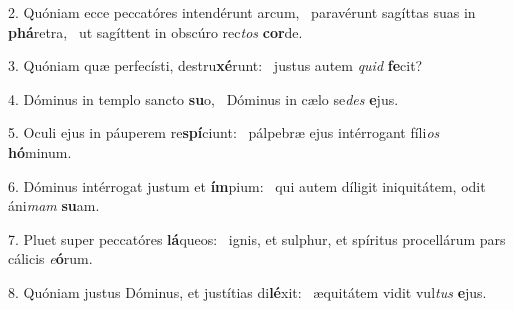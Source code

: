 2. Quóniam ecce peccatóres intendérunt arcum, \dag\  paravérunt sagíttas suas in \textbf{phá}retra, \ast\  ut sagíttent in obscúro rec\textit{tos} \textbf{cor}de.\

3. Quóniam quæ perfecísti, destru\textbf{xé}runt: \ast\  justus autem \textit{quid} \textbf{fe}cit?\

4. Dóminus in templo sancto \textbf{su}o, \ast\  Dóminus in cælo se\textit{des} \textbf{e}jus.\

5. Oculi ejus in páuperem re\textbf{spí}ciunt: \ast\  pálpebræ ejus intérrogant fíli\textit{os} \textbf{hó}minum.\

6. Dóminus intérrogat justum et \textbf{ím}pium: \ast\  qui autem díligit iniquitátem, odit áni\textit{mam} \textbf{su}am.\

7. Pluet super peccatóres \textbf{lá}queos: \ast\  ignis, et sulphur, et spíritus procellárum pars cálicis \textit{e}\textbf{ó}rum.\

8. Quóniam justus Dóminus, et justítias di\textbf{lé}xit: \ast\  æquitátem vidit vul\textit{tus} \textbf{e}jus.\

